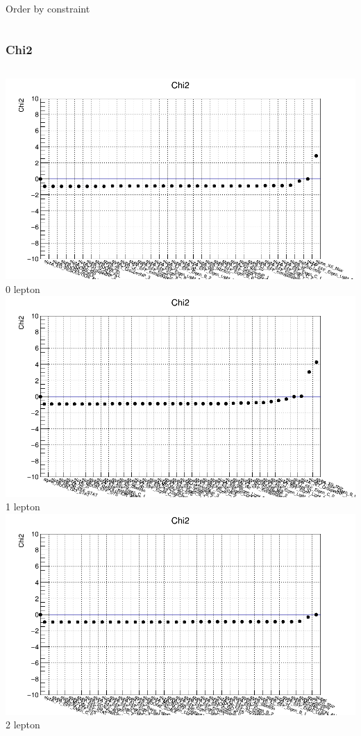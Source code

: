 \documentclass{beamer}
\begin{document}
\begin{frame}
\begin{columns}[t]
\tiny{ Order by constraint }\\
\end{columns}
\end{frame}

\begin{frame}
\frametitle{Chi2}
\begin{columns}[t]
\centering
\includegraphics[width=0.8\linewidth]{pics/chi_0lep_merge.png}\\
\tiny{ 0 lepton }\\
\includegraphics[width=0.8\linewidth]{pics/chi_1lep_merge.png}\\
\tiny{ 1 lepton  }\\
\centering
\includegraphics[width=0.8\linewidth]{pics/chi_2lep_merge.png}\\
\tiny{ 2 lepton }\\

\end{columns}
\end{frame}
\end{document}
